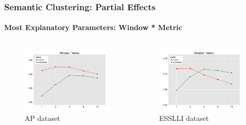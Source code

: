 \documentclass[t]{beamer} %
\begin{document}
\begin{frame}
  \frametitle{Semantic Clustering: Partial Effects}
  \framesubtitle{Most Explanatory Parameters: Window * Metric}
  
  \vspace{-18pt}   

  \begin{columns}
    
    \begin{column}{0.5\textwidth}
      \begin{figure} 
        \hspace*{-18pt} 
        \includegraphics[scale=0.30]{img/lapesa_ap_main_window_metric}
        \vspace{-10pt}
        \caption{AP dataset}
      \end{figure}
    \end{column}

    \begin{column}{0.5\textwidth}
      \centering
      
      \begin{figure}
        \hspace*{-18pt}   
        \includegraphics[scale=0.30]{img/lapesa_esslli_main_window_metric}
        \vspace{-10pt}
        \caption{ESSLLI dataset}
      \end{figure}
      

\end{column}
\end{columns}
\end{frame}
\end{document}
